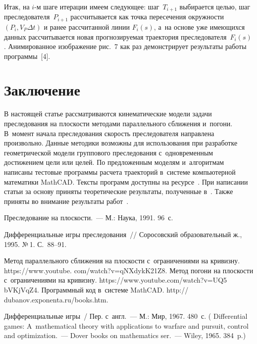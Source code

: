 \begin{multicols}{2}
  Итак, на $i$-м шаге итерации имеем сле\-ду\-ющее: шаг~$T_{i+1}$ выбирается 
целью, шаг преследователя~$P_{i+1}$ рассчитывается как точка пересечения 
окружности $(P_i, V_P \Delta t)$ и ранее рассчитанной линии $F_i(s)$, а~на 
основе уже имеющихся данных рассчитывается новая прогнозируемая 
траектория преследователя~$F_i(s)$. Анимированное изображение рис.~7 как 
раз демонстрирует результаты работы программы~[4]. 

\section{Заключение}

   В настоящей статье рассматриваются кинематические модели задачи 
преследования на плос\-кости методами параллельного сбли\-же\-ния и~погони. 
В~момент начала преследования ско\-рость преследователя на\-прав\-ле\-на 
произвольно. Данные методики возможны для использования при разработке 
геометрической модели группового пре\-сле\-до\-ва\-ния с~одновременным 
достижением цели или целей. По предложенным моделям и~алгоритмам 
написаны тес\-то\-вые программы расчета траекторий в~сис\-те\-ме компьютерной 
математики MathCAD. Тексты программ доступны на ресурсе~\cite{13-dub}. При написании статьи за основу приняты теоретические 
результаты, полученные в~\cite{1-dub, 2-dub, 3-dub}. Также приняты во 
внимание результаты  
работ~\cite{4-dub, 5-dub, 6-dub, 7-dub, 8-dub, 9-dub, 10-dub}.
   
{\small\frenchspacing
 {%
 \begin{thebibliography}{99}


 Преследование на плоскости.~--- М.: Наука, 1991. 96~с. 

 Дифференциальные игры преследования~// Соросовский 
образовательный ж., 1995. №\,1. С.~88--91.

Метод параллельного сближения на плос\-кости с~ограничениями на кривизну. {\sf 
https://www.youtube. com/watch?v=qNXdykK21Z8}.
Метод погони на плос\-кости с~ограничениями на кривизну. {\sf 
https://www.youtube.com/watch?v=UQ5 bVKjVqZ4}.
Программный код в~системе MathCAD. {\sf http:// dubanov.exponenta.ru/books.htm}.

 Дифференциальные игры~/ Пер. с~англ.~--- М.: Мир, 1967. 480~с.
( {Differential games: A~mathematical theory with applications to warfare and pursuit, control and optimization}.~---
Dover books on mathematics ser.~--- Wiley, 1965. 384~p.)


\end{thebibliography}}}
\end{multicols}
